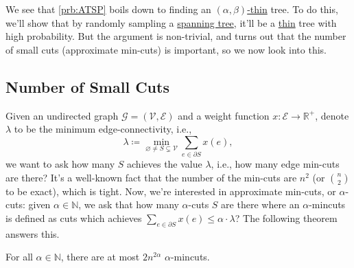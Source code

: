 We see that \autoref{prb:ATSP} boils down to finding an \hyperref[def:thin]{\((\alpha , \beta )\)-thin} tree. To do this, we'll show that by randomly sampling a \hyperref[def:spanning-tree]{spanning tree}, it'll be a \hyperref[def:thin]{thin} tree with high probability. But the argument is non-trivial, and turns out that the number of small cuts (approximate min-cuts) is important, so we now look into this.

\subsection{Number of Small Cuts}
Given an undirected graph \(\mathcal{G} =(\mathcal{V} , \mathcal{E} )\) and a weight function \(x\colon \mathcal{E} \to \mathbb{R} ^+\), denote \(\lambda \) to be the minimum edge-connectivity, i.e.,
\[
	\lambda \coloneqq \min _{\varnothing \neq S \subsetneq \mathcal{V} } \sum_{e\in \partial S} x(e),
\]
we want to ask how many \(S\) achieves the value \(\lambda \), i.e., how many edge min-cuts are there? It's a well-known fact that the number of the min-cuts are \(n^2\) (or \(\binom{n}{2}\) to be exact), which is tight. Now, we're interested in approximate min-cuts, or \(\alpha\)-cuts: given \(\alpha \in \mathbb{N} \), we ask that how many \(\alpha \)-cuts \(S\) are there where an \(\alpha \)-mincuts is defined as cuts which achieves \(\sum_{e\in \partial S} x(e) \leq \alpha \cdot \lambda \)? The following theorem answers this.

\begin{theorem}\label{thm:num-small-mincuts}
	For all \(\alpha \in \mathbb{N} \), there are at most \(2n^{2\alpha }\) \(\alpha\)-mincuts.
\end{theorem}